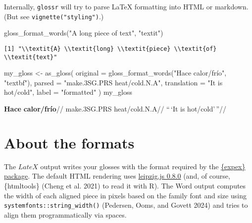 \documentclass[
  letterpaper,
  DIV=11,
  numbers=noendperiod]{scrartcl}
\newenvironment{Shaded}{\begin{snugshade}}{\end{snugshade}}
\newcommand{\AttributeTok}[1]{\textcolor[rgb]{0.40,0.45,0.13}{#1}}
\newcommand{\FunctionTok}[1]{\textcolor[rgb]{0.28,0.35,0.67}{#1}}
\newcommand{\NormalTok}[1]{\textcolor[rgb]{0.00,0.23,0.31}{#1}}
\newcommand{\OtherTok}[1]{\textcolor[rgb]{0.00,0.23,0.31}{#1}}
\newcommand{\StringTok}[1]{\textcolor[rgb]{0.13,0.47,0.30}{#1}}
\begin{document}
Internally, \texttt{glossr} will try to parse LaTeX formatting into HTML
or markdown. (But see \texttt{vignette("styling")}.)

\begin{Shaded}
\begin{Highlighting}[]
\FunctionTok{gloss\_format\_words}\NormalTok{(}\StringTok{"A long piece of text"}\NormalTok{, }\StringTok{"textit"}\NormalTok{)}
\end{Highlighting}
\end{Shaded}

\begin{verbatim}
[1] "\\textit{A} \\textit{long} \\textit{piece} \\textit{of} \\textit{text}"
\end{verbatim}

\begin{Shaded}
\begin{Highlighting}[]
\NormalTok{my\_gloss }\OtherTok{\textless{}{-}} \FunctionTok{as\_gloss}\NormalTok{(}
  \AttributeTok{original =} \FunctionTok{gloss\_format\_words}\NormalTok{(}\StringTok{"Hace calor/frío"}\NormalTok{, }\StringTok{"textbf"}\NormalTok{),}
  \AttributeTok{parsed =} \StringTok{"make.3SG.PRS heat/cold.N.A"}\NormalTok{,}
  \AttributeTok{translation =} \StringTok{"\textquotesingle{}It is hot/cold\textquotesingle{}"}\NormalTok{,}
  \AttributeTok{label =} \StringTok{"formatted"}
\NormalTok{)}
\NormalTok{my\_gloss}
\end{Highlighting}
\end{Shaded}

\ex\label{formatted}
\begingl \gla \textbf{Hace} \textbf{calor/frío}// \glb make.3SG.PRS
heat/cold.N.A// \glft ``\,`It is hot/cold'\,''// \endgl \xe 

\section{About the formats}\label{about-the-formats}

The \(LateX\) output writes your glosses with the format required by the
\href{https://ctan.org/pkg/expex}{\{expex\} package}. The default HTML
rendering uses
\href{https://github.com/bdchauvette/leipzig.js/}{leipzig.js 0.8.0}
(and, of course, \{htmltools\} (Cheng et al. 2021) to read it with R).
The Word output computes the width of each aligned piece in pixels based
on the family font and size using \texttt{systemfonts::string\_width()}
(Pedersen, Ooms, and Govett 2024) and tries to align them
programmatically via spaces.
\end{document}
